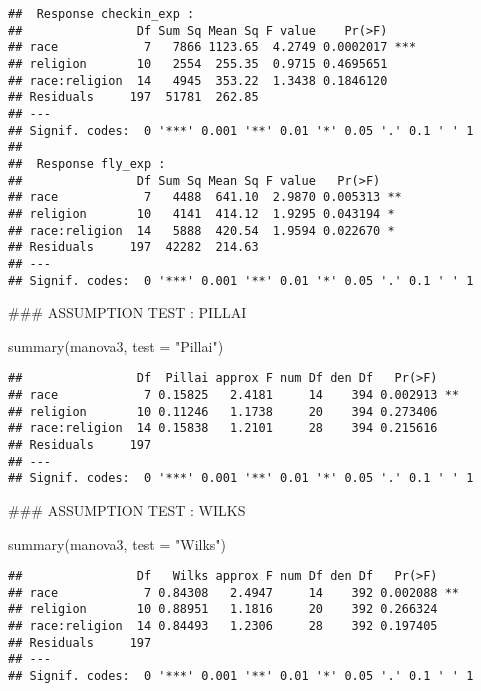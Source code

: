 \documentclass[
]{article}
\newenvironment{Shaded}{\begin{snugshade}}{\end{snugshade}}
\newcommand{\AttributeTok}[1]{\textcolor[rgb]{0.77,0.63,0.00}{#1}}
\newcommand{\FunctionTok}[1]{\textcolor[rgb]{0.00,0.00,0.00}{#1}}
\newcommand{\NormalTok}[1]{#1}
\newcommand{\StringTok}[1]{\textcolor[rgb]{0.31,0.60,0.02}{#1}}
\begin{document}
\begin{verbatim}
##  Response checkin_exp :
##                Df Sum Sq Mean Sq F value    Pr(>F)    
## race            7   7866 1123.65  4.2749 0.0002017 ***
## religion       10   2554  255.35  0.9715 0.4695651    
## race:religion  14   4945  353.22  1.3438 0.1846120    
## Residuals     197  51781  262.85                      
## ---
## Signif. codes:  0 '***' 0.001 '**' 0.01 '*' 0.05 '.' 0.1 ' ' 1
## 
##  Response fly_exp :
##                Df Sum Sq Mean Sq F value   Pr(>F)   
## race            7   4488  641.10  2.9870 0.005313 **
## religion       10   4141  414.12  1.9295 0.043194 * 
## race:religion  14   5888  420.54  1.9594 0.022670 * 
## Residuals     197  42282  214.63                    
## ---
## Signif. codes:  0 '***' 0.001 '**' 0.01 '*' 0.05 '.' 0.1 ' ' 1
\end{verbatim}

\hfill\break
\#\#\# ASSUMPTION TEST : PILLAI

\begin{Shaded}
\begin{Highlighting}[]
\FunctionTok{summary}\NormalTok{(manova3,}
        \AttributeTok{test =} \StringTok{"Pillai"}\NormalTok{)}
\end{Highlighting}
\end{Shaded}

\begin{verbatim}
##                Df  Pillai approx F num Df den Df   Pr(>F)   
## race            7 0.15825   2.4181     14    394 0.002913 **
## religion       10 0.11246   1.1738     20    394 0.273406   
## race:religion  14 0.15838   1.2101     28    394 0.215616   
## Residuals     197                                           
## ---
## Signif. codes:  0 '***' 0.001 '**' 0.01 '*' 0.05 '.' 0.1 ' ' 1
\end{verbatim}

\hfill\break
\#\#\# ASSUMPTION TEST : WILKS

\begin{Shaded}
\begin{Highlighting}[]
\FunctionTok{summary}\NormalTok{(manova3,}
        \AttributeTok{test =} \StringTok{"Wilks"}\NormalTok{)}
\end{Highlighting}
\end{Shaded}

\begin{verbatim}
##                Df   Wilks approx F num Df den Df   Pr(>F)   
## race            7 0.84308   2.4947     14    392 0.002088 **
## religion       10 0.88951   1.1816     20    392 0.266324   
## race:religion  14 0.84493   1.2306     28    392 0.197405   
## Residuals     197                                           
## ---
## Signif. codes:  0 '***' 0.001 '**' 0.01 '*' 0.05 '.' 0.1 ' ' 1
\end{verbatim}
\end{document}

